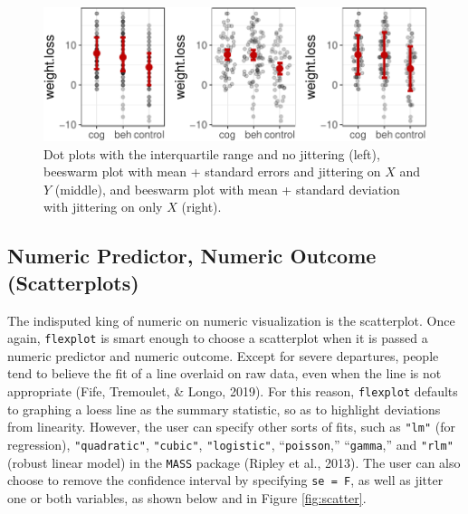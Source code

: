 \documentclass[
  english,
  man]{apa6}
\begin{document}
\begin{figure}

{\centering \includegraphics[width=0.9\linewidth]{flexplot_psychmeth_files/figure-latex/jitterit-1} 

}

\caption{Dot plots with the interquartile range and no jittering (left), beeswarm plot with mean + standard errors and jittering on $X$ and $Y$ (middle), and beeswarm plot with mean + standard deviation with jittering on only $X$ (right).}\label{fig:jitterit}
\end{figure}

\normalsize

\hypertarget{numeric-predictor-numeric-outcome-scatterplots}{%
\subsection{Numeric Predictor, Numeric Outcome (Scatterplots)}\label{numeric-predictor-numeric-outcome-scatterplots}}

The indisputed king of numeric on numeric visualization is the scatterplot. Once again, \texttt{flexplot} is smart enough to choose a scatterplot when it is passed a numeric predictor and numeric outcome. Except for severe departures, people tend to believe the fit of a line overlaid on raw data, even when the line is not appropriate (Fife, Tremoulet, \& Longo, 2019). For this reason, \texttt{flexplot} defaults to graphing a loess line as the summary statistic, so as to highlight deviations from linearity. However, the user can specify other sorts of fits, such as \texttt{"lm"} (for regression), \texttt{"quadratic"}, \texttt{"cubic"}, \texttt{"logistic"}, ``\texttt{poisson},'' ``\texttt{gamma},'' and \texttt{"rlm"} (robust linear model) in the \texttt{MASS} package (Ripley et al., 2013). The user can also choose to remove the confidence interval by specifying \texttt{se\ =\ F}, as well as jitter one or both variables, as shown below and in Figure \ref{fig:scatter}.

\small
\end{document}
